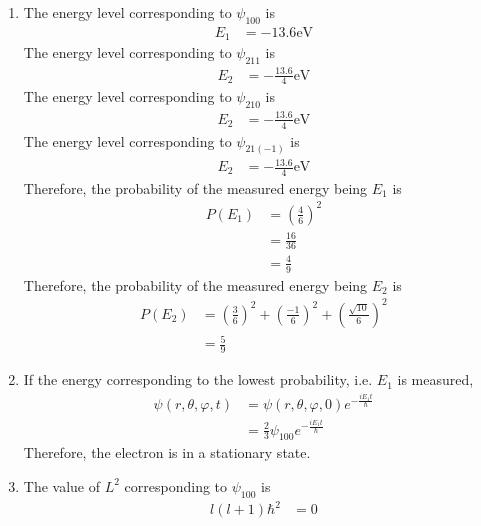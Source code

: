 \documentclass[fleqn, a4paper, 11pt, oneside]{amsart}
\theoremstyle{definition}
\theoremstyle{theorem}
\begin{document}
\begin{solution}
	\begin{enumerate}[leftmargin=*]
		\item
			The energy level corresponding to $\psi_{1 0 0}$ is
			\begin{align*}
				E_1 & = -13.6 \si{\electronvolt}
			\end{align*}
			The energy level corresponding to $\psi_{2 1 1}$ is
			\begin{align*}
				E_2 & = -\frac{13.6}{4} \si{\electronvolt}
			\end{align*}
			The energy level corresponding to $\psi_{2 1 0}$ is
			\begin{align*}
				E_2 & = -\frac{13.6}{4} \si{\electronvolt}
			\end{align*}
			The energy level corresponding to $\psi_{2 1 (-1)}$ is
			\begin{align*}
				E_2 & = -\frac{13.6}{4} \si{\electronvolt}
			\end{align*}
			Therefore, the probability of the measured energy being $E_1$ is
			\begin{align*}
				P(E_1) & = \left( \frac{4}{6} \right)^2 \\
                                       & = \frac{16}{36}                \\
                                       & = \frac{4}{9}
			\end{align*}
			Therefore, the probability of the measured energy being $E_2$ is
			\begin{align*}
				P(E_2) & = \left( \frac{3}{6} \right)^2 + \left( \frac{-1}{6} \right)^2 + \left( \frac{\sqrt{10}}{6} \right)^2 \\
                                       & = \frac{5}{9}
			\end{align*}
		\item
			If the energy corresponding to the lowest probability, i.e. $E_1$ is measured,
			\begin{align*}
				\psi(r,\theta,\varphi,t) & = \psi(r,\theta,\varphi,0) e^{-\frac{i E_1 t}{\hbar}} \\
                                                         & = \frac{2}{3} \psi_{1 0 0} e^{-\frac{i E_1 t}{\hbar}}
			\end{align*}
			Therefore, the electron is in a stationary state.
		\item
			The value of $L^2$ corresponding to $\psi_{1 0 0}$ is
			\begin{align*}
				l (l + 1) \hbar^2 & = 0
			\end{align*}

\end{enumerate}
\end{solution}
\end{document}
